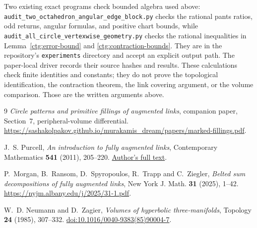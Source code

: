 \documentclass[11pt]{article}
\numberwithin{equation}{section}
\theoremstyle{definition}
\theoremstyle{remark}
\begin{document}
Two existing exact programs check bounded algebra used above:
\nolinkurl{audit_two_octahedron_angular_edge_block.py} checks the
rational pants ratios, odd returns, angular formulas, and positive
chart bounds, while
\nolinkurl{audit_all_circle_vertexwise_geometry.py} checks the
rational inequalities in Lemma~\ref{ctg:error-bound} and
\eqref{ctg:contraction-bounds}. They are in the repository's
\texttt{experiments} directory and accept an explicit output path.
The paper-local driver records their source hashes and results.
These calculations check finite identities and constants; they do
not prove the topological identification, the contraction theorem,
the link covering argument, or the volume comparison. Those are
the written arguments above.

\begin{thebibliography}{9}
\emph{Circle patterns and primitive fillings of augmented links}, companion paper,
Section~7, peripheral-volume differential.
\url{https://sashakolpakov.github.io/murakamis_dream/papers/marked-fillings.pdf}.

J.~S. Purcell, \emph{An introduction to fully augmented links},
Contemporary Mathematics \textbf{541} (2011), 205--220.
\href{https://users.monash.edu/~jpurcell/papers/expos-auglinks.pdf}
{Author's full text}.

P.~Morgan, B.~Ransom, D.~Spyropoulos, R.~Trapp and C.~Ziegler,
\emph{Belted sum decompositions of fully augmented links},
New York J. Math. \textbf{31} (2025), 1--42.
\url{https://nyjm.albany.edu/j/2025/31-1.pdf}.

W.~D. Neumann and D.~Zagier,
\emph{Volumes of hyperbolic three-manifolds},
Topology \textbf{24} (1985), 307--332.
\href{https://doi.org/10.1016/0040-9383(85)90004-7}
{doi:10.1016/0040-9383(85)90004-7}.
\end{thebibliography}
\end{document}
